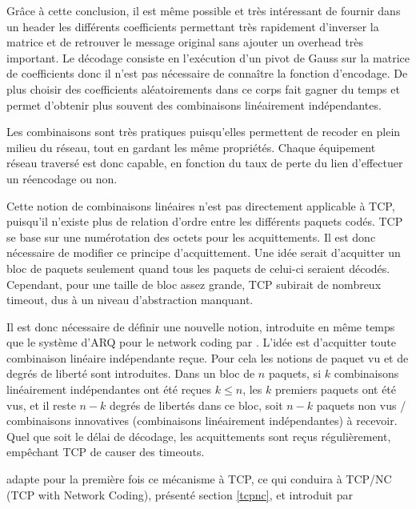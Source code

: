 \documentclass[frenchb]{article}
\begin{document}
 Grâce à cette conclusion, il est même possible et très intéressant de fournir dans un header les différents coefficients permettant très rapidement d'inverser la matrice et de retrouver le message original sans ajouter un overhead très important. Le décodage consiste en l'exécution d'un pivot de Gauss sur la matrice de coefficients donc il n'est pas nécessaire de connaître la fonction d'encodage. De plus choisir des coefficients aléatoirements dans ce corps fait gagner du temps et permet d'obtenir plus souvent des combinaisons linéairement indépendantes.

Les combinaisons sont très pratiques puisqu'elles permettent de recoder en plein milieu du réseau, tout en gardant les même propriétés. Chaque équipement réseau traversé est donc capable, en fonction du taux de perte du lien d'effectuer un réencodage ou non.

Cette notion de combinaisons linéaires n'est pas directement applicable à TCP, puisqu'il n'existe plus de relation d'ordre entre les différents paquets codés. TCP se base sur une numérotation des octets pour les acquittements. Il est donc nécessaire de modifier ce principe d'acquittement.
Une idée serait d'acquitter un bloc de paquets seulement quand tous les paquets de celui-ci seraient décodés. Cependant, pour une taille de bloc assez grande, TCP subirait de nombreux timeout, dus à un niveau d'abstraction manquant.

Il est donc nécessaire de définir une nouvelle notion, introduite en même temps que le système d'ARQ pour le network coding par \cite{arqfornc}. L'idée est d'acquitter toute combinaison linéaire indépendante reçue. Pour cela les notions de paquet vu et de degrés de liberté sont introduites. Dans un bloc de $n$ paquets, si $k$ combinaisons linéairement indépendantes ont été reçues $k \le n$, les $k$ premiers paquets ont été vus, et il reste $n-k$ degrés de libertés dans ce bloc, soit $n-k$ paquets non vus / combinaisons innovatives (combinaisons linéairement indépendantes) à recevoir. Quel que soit le délai de décodage, les acquittements sont reçus régulièrement, empêchant TCP de causer des timeouts.

\cite{ncmeetstcp} adapte pour la première fois ce mécanisme à TCP, ce qui conduira à TCP/NC (TCP with Network Coding), présenté section \ref{tcpnc}, et introduit par \cite{tcp/nc}
\end{document}
